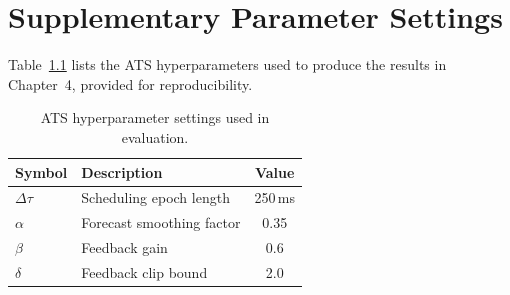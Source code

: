 \chapter{Supplementary Parameter Settings}
\seceps

Table~\ref{tab:params} lists the ATS hyperparameters used to produce the
results in Chapter~4, provided for reproducibility.

\begin{table}[h]
\centering
\caption{ATS hyperparameter settings used in evaluation.}
\label{tab:params}
\begin{tabular}{@{}llc@{}}
\toprule
\textbf{Symbol} & \textbf{Description} & \textbf{Value}\\
\midrule
$\Delta\tau$ & Scheduling epoch length & 250\,ms\\
$\alpha$ & Forecast smoothing factor & 0.35\\
$\beta$ & Feedback gain & 0.6\\
$\delta$ & Feedback clip bound & 2.0\\
\bottomrule
\end{tabular}
\end{table}
